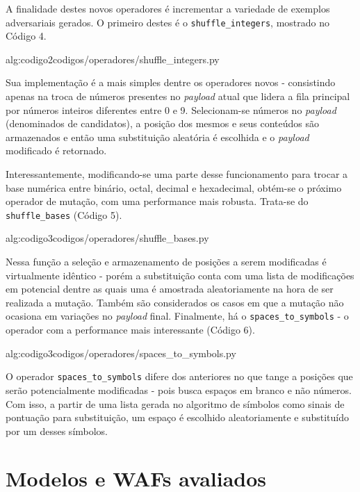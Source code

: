 A finalidade destes novos operadores é incrementar a variedade de exemplos adversariais gerados. O primeiro destes é o \verb+shuffle_integers+, mostrado no Código 4.

\label{sec:codigos}
 {alg:codigo2}{codigos/operadores/shuffle_integers.py}

\bigskip

Sua implementação é a mais simples dentre os operadores novos - consistindo apenas na troca de números presentes no \textit{payload} atual que lidera a fila principal por números inteiros diferentes entre 0 e 9. Selecionam-se números no \textit{payload} (denominados de candidatos), a posição dos mesmos e seus conteúdos são armazenados e então uma substituição aleatória é escolhida e o \textit{payload} modificado é retornado.  

Interessantemente, modificando-se uma parte desse funcionamento para trocar a base numérica entre binário, octal, decimal e hexadecimal, obtém-se o próximo operador de mutação, com uma performance mais robusta. Trata-se do \verb+shuffle_bases+ (Código 5).

\label{sec:codigos}
 {alg:codigo3}{codigos/operadores/shuffle_bases.py}

\bigskip

Nessa função a seleção e armazenamento de posições a serem modificadas é virtualmente idêntico - porém a substituição conta com uma lista de modificações em potencial dentre as quais uma é amostrada aleatoriamente na hora de ser realizada a mutação. Também são considerados os casos em que a mutação não ocasiona em variações no \textit{payload} final. Finalmente, há o \verb+spaces_to_symbols+ - o operador com a performance mais interessante (Código 6).

\label{sec:codigos}
 {alg:codigo3}{codigos/operadores/spaces_to_symbols.py}

\bigskip

O operador \verb+spaces_to_symbols+ difere dos anteriores no que tange a posições que serão potencialmente modificadas - pois busca espaços em branco e não números. Com isso, a partir de uma lista gerada no algoritmo de símbolos como sinais de pontuação para substituição, um espaço é escolhido aleatoriamente e substituído por um desses símbolos.

\bigskip

\section{Modelos e WAFs avaliados}

